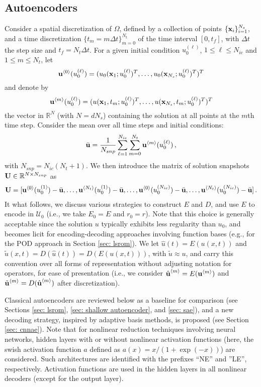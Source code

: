 \subsection{Autoencoders}\label{sec: autoencoders}
Consider a spatial discretization of $\Omega$, defined by a collection of points $\{\textbf{x}_i\}_{i = 1}^{N_s}$, and a time discretization $\{t_m = m \Delta t\}_{m = 0}^{N_t}$ of the time interval $[0,t_f]$, with $\Delta t$ the step size and $t_f = N_t \Delta t$. For a given initial condition $u_0^{(\ell)}$, $1 \leq \ell \leq N_{ic}$ and $1 \leq m \leq N_t$, let 
$$\textbf{u}^{\left<0\right>}(u_0^{(\ell)}) = (u_0(\textbf{x}_1; u_0^{(\ell)})^T, \ldots, u_0(\textbf{x}_{N_s}; u_0^{(\ell)})^T)^T$$
and denote by
$$\textbf{u}^{\left<m\right>}(u_0^{(\ell)}) = (u(\textbf{x}_1, t_m; u_0^{(\ell)})^T, \ldots, u(\textbf{x}_{N_s}, t_m; u_0^{(\ell)})^T)^T$$
the vector in $\mathbb{R}^N$ (with $N = d N_s$) containing the solution at all points at the $m$th time step. Consider the mean over all time steps and initial conditions:
\begin{align}
    \bar{\textbf{u}} = \frac{1}{N_{snp}} \sum_{\ell = 1}^{N_{ic}} \sum_{m = 0}^{N_t} \textbf{u}^{\left<m\right>}(u_0^{(\ell)})\,,
\end{align}
with $N_{snp}=N_{ic}(N_t + 1)$. We then introduce the matrix of solution snapshots $\textbf{U} \in \mathbb{R}^{N \times N_{snp}}$ as
\begin{align}\label{eq:snapshot-matrix}
    \textbf{U} = [\textbf{u}^{\left<0\right>}(u_0^{(1)}) - \bar{\textbf{u}}, \ldots, \textbf{u}^{\left<N_t\right>}(u_0^{(1)}) - \bar{\textbf{u}}, \ldots, \textbf{u}^{\left<0\right>}(u_0^{(N_{ic})}) - \bar{\textbf{u}}, \ldots, \textbf{u}^{\left<N_t\right>}(u_0^{(N_{ic})}) - \bar{\textbf{u}}]\,.
\end{align}
It what follows, we discuss various strategies to construct $E$ and $D$, and use $E$ to encode in $\mathcal{U}_0$ (i.e., we take $E_0 = E$ and $r_0 = r$). Note that this choice is generally acceptable since the solution $u$ typically exhibits less regularity than $u_0$, and becomes licit for encoding-decoding approaches involving function bases (e.g., for the POD approach in Section \ref{sec: lsrom}). We let $\hat{u}(t) = E(u(x,t))$ and $\tilde{u}(x,t) = D(\hat{u}(t)) = D(E(u(x,t)))$, with $\tilde{u} \approx u$, and carry this convention over all forms of representation without adjusting notation for operators, for ease of presentation (i.e., we consider $\hat{\textbf{u}}^{\left<m\right>} = E(\textbf{u}^{\left<m\right>})$ and $\tilde{\textbf{u}}^{\left<m\right>} = D(\hat{\textbf{u}}^{\left<m\right>})$ after discretization). 

Classical autoencoders are reviewed below as a baseline for comparison (see Sections \ref{sec: lsrom}, \ref{sec: shallow autoencoder}, and \ref{sec: sae}), and a new decoding strategy, inspired by adaptive basis methods, is proposed (see Section \ref{sec: cnnae}). Note that for nonlinear reduction techniques involving neural networks, hidden layers with or without nonlinear activation functions (here, the swish activation function $a$ defined as $a(x) = x/(1+\exp(-x))$) are considered. Such architectures are identified with the prefixes ``NE'' and ''LE'', respectively. Activation functions are used in the hidden layers in all nonlinear decoders (except for the output layer). 

